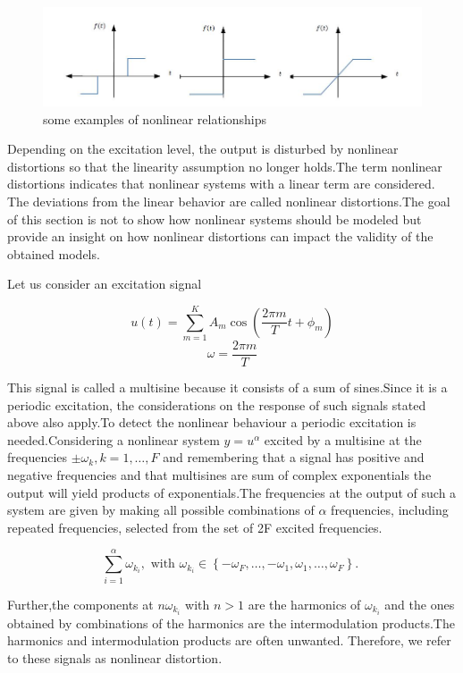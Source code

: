 \documentclass[a4paper,12pt]{report}
\numberwithin{equation}{section}
\begin{document}
\begin{figure}[H]
    \includegraphics[scale=1]{examplenonlinear.JPG}
    \centering
    \caption{some examples of nonlinear relationships}
    \label{fig:examplenonlinear}
\end{figure}



Depending on the excitation level, the output is disturbed by nonlinear distortions so that the linearity assumption no longer holds.The term nonlinear distortions indicates that nonlinear systems with a linear term are considered. The deviations from the linear behavior are called nonlinear distortions.The goal of this section is not to show how nonlinear systems should be modeled but provide an insight on how nonlinear distortions can impact the validity of the obtained models.

Let us consider an excitation signal

\[u(t)=\sum_{m=1}^{K} A_{m} \cos \left(\frac{2 \pi m}{T} t+\phi_{m}\right)\]
\[\omega=\frac{2 \pi m}{T}\]

This signal is called a multisine because it consists of a sum of sines.Since it is a periodic excitation, the considerations on the response of such signals stated above also apply.To detect the nonlinear behaviour a periodic excitation is needed.Considering a nonlinear system $y=u^{\alpha}$ excited by a multisine at the frequencies $\pm \omega_{k}, k=1, \ldots, F$ and remembering that a signal has  positive and negative frequencies and that multisines are sum of complex exponentials the output will yield products of exponentials.The frequencies at the output of such a system are given by making all possible combinations of $\alpha$ frequencies, including repeated frequencies, selected from the set of 2F excited frequencies.

\[\sum_{i=1}^{\alpha} \omega_{k_{i}}, \text { with } \omega_{k_{i}} \in\left\{-\omega_{F}, \ldots,-\omega_{1}, \omega_{1}, \ldots, \omega_{F}\right\} \text {. }\]

Further,the components at $n\omega_{k_{i}}$ with $n > 1$ are the harmonics of $\omega_{k_{i}}$ and the ones obtained by combinations of the harmonics are the intermodulation products.The harmonics and intermodulation products are often unwanted. Therefore, we refer to these signals as nonlinear distortion.
\end{document}
